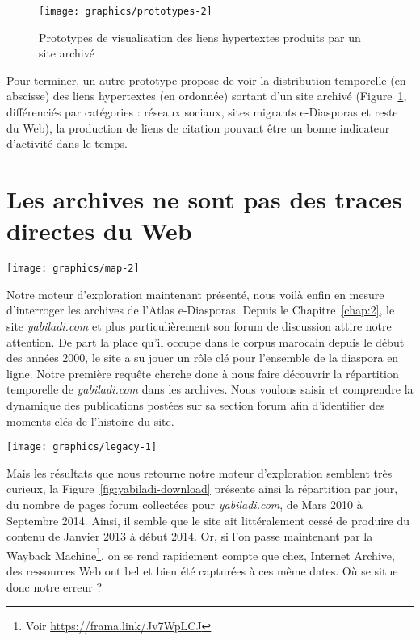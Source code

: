 \documentclass[symmetric,justified,marginals=raggedouter]{tufte-book}
\begin{document}
\begin{figure}%
  \texttt{[image: graphics/prototypes-2]}
  \caption{Prototypes de visualisation des liens hypertextes produits par un site archivé}
  \label{fig:prototypes-2}
\end{figure}

\noindent Pour terminer, un autre prototype propose de voir la distribution temporelle (en abscisse) des liens hypertextes (en ordonnée) sortant d'un site archivé (Figure~\ref{fig:prototypes-2}, différenciés par catégories : réseaux sociaux, sites migrants e-Diasporas et reste du Web), la production de liens de citation pouvant être un bonne indicateur d'activité dans le temps. 

\section{Les archives ne sont pas des traces directes du Web}
\label{sec:4_legacy}

\begin{marginfigure}%
  \texttt{[image: graphics/map-2]}
  \vspace*{0.2cm}  
  \caption{\textit{yabiladi.com} (rouge) dans l'e-Diaspora marocaine (Section \ref{sec:2_atlas})}
  \label{fig:yabiladi-map}
\end{marginfigure} 

\noindent Notre moteur d'exploration maintenant présenté, nous voilà enfin en mesure d'interroger les archives de l'Atlas e-Diasporas. Depuis le Chapitre~\ref{chap:2}, le site \textit{yabiladi.com} et plus particulièrement son forum de discussion attire notre attention. De part la place qu'il occupe dans le corpus marocain depuis le début des années 2000, le site a su jouer un rôle clé pour l'ensemble de la diaspora en ligne. Notre première requête cherche donc à nous faire découvrir la répartition temporelle de \textit{yabiladi.com} dans les archives. Nous voulons saisir et comprendre la dynamique des publications postées sur sa section forum afin d'identifier des moments-clés de l'histoire du site. 

\begin{figure*}%
  \texttt{[image: graphics/legacy-1]}
  \caption{Distribution du nombre de pages archivées par jours pour \textit{yabiladi.com}}
  \label{fig:yabiladi-download}
\end{figure*}

\noindent Mais les résultats que nous retourne notre moteur d'exploration semblent très curieux, la Figure~\ref{fig:yabiladi-download} présente ainsi la répartition par jour, du nombre de pages forum collectées pour \textit{yabiladi.com}, de Mars 2010 à Septembre 2014. Ainsi, il semble que le site ait littéralement cessé de produire du contenu de Janvier 2013 à début 2014. Or, si l'on passe maintenant par la Wayback Machine\footnote{\RaggedOuter Voir \url{https://frama.link/Jv7WpLCJ}}, on se rend rapidement compte que chez, Internet Archive, des ressources Web ont bel et bien été capturées à ces même dates. Où se situe donc notre erreur ?
\end{document}

